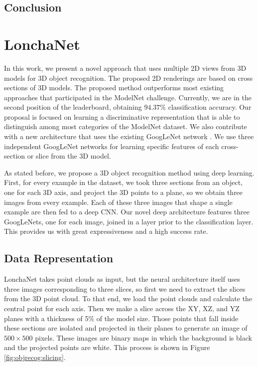 \subsection{Conclusion}
\label{cha:objrecog:sec:study:subsec:conclusion}

\section{LonchaNet}
\label{cha:objrecog:sec:lonchanet}

In this work, we present a novel approach that uses multiple 2D views from 3D models for 3D object recognition. The proposed 2D renderings are based on cross sections of 3D models. The proposed method outperforms most existing approaches that participated in the ModelNet challenge. Currently, we are in the second position of the leaderboard, obtaining $94.37\%$ classification accuracy. Our proposal is focused on learning a discriminative representation that is able to distinguish among most categories of the ModelNet dataset. We also contribute with a new architecture that uses the existing GoogLeNet network \cite{Szegedy2015}. We use three independent GoogLeNet networks for learning specific features of each cross-section or slice from the 3D model.

As stated before, we propose a 3D object recognition method using deep learning. First, for every example in the dataset, we took three sections from an object, one for each 3D axis, and project the 3D points to a plane, so we obtain three images from every example.  Each of these three images that shape a single example are then fed to a deep \acl{CNN}. Our novel deep architecture features three GoogLeNets, one for each image, joined in a layer prior to the classification layer. This provides us with great expressiveness and a high success rate.

\subsection{Data Representation}
\label{cha:objrecog:sec:lonchanet:subsec:representation}

LonchaNet takes point clouds as input, but the neural architecture itself uses three images corresponding to three slices, so first we need to extract the slices from the 3D point cloud. To that end, we load the point clouds and calculate the central point for each axis. Then we make a slice across the XY, XZ, and YZ planes with a thickness of 5\% of the model size. Those points that fall inside these sections are isolated and projected in their planes to generate an image of $500 \times 500$ pixels. These images are binary maps in which the background is black and the projected points are white. This process is shown in Figure \ref{fig:objrecog:slicing}.

